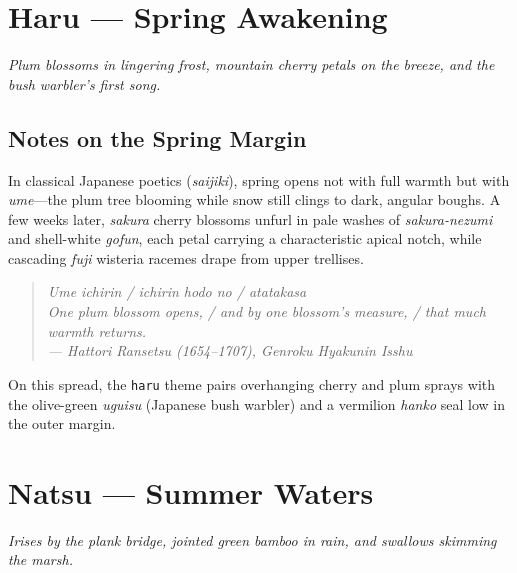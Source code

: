\documentclass[10pt,a5paper,twoside,openany]{report}
\begin{document}
\chapter*{Haru --- Spring Awakening}
\vspace{2mm}
\noindent\emph{Plum blossoms in lingering frost, mountain cherry petals on the breeze, and the bush warbler's first song.}
\clearpage

\section*{Notes on the Spring Margin}

In classical Japanese poetics (\emph{saijiki}), spring opens not with full warmth but with \emph{ume}---the plum tree blooming while snow still clings to dark, angular boughs. A few weeks later, \emph{sakura} cherry blossoms unfurl in pale washes of \emph{sakura-nezumi} and shell-white \emph{gofun}, each petal carrying a characteristic apical notch, while cascading \emph{fuji} wisteria racemes drape from upper trellises.

\begin{quote}
\itshape
Ume ichirin / ichirin hodo no / atatakasa\\[2pt]
One plum blossom opens, / and by one blossom's measure, / that much warmth returns.\\[2pt]
\upshape\footnotesize --- Hattori Ransetsu (1654--1707), \emph{Genroku Hyakunin Isshu}
\end{quote}

On this spread, the \texttt{haru} theme pairs overhanging cherry and plum sprays with the olive-green \emph{uguisu} (Japanese bush warbler) and a vermilion \emph{hanko} seal low in the outer margin.

\clearpage

\chapter*{Natsu --- Summer Waters}
\vspace{2mm}
\noindent\emph{Irises by the plank bridge, jointed green bamboo in rain, and swallows skimming the marsh.}
\clearpage
\end{document}
